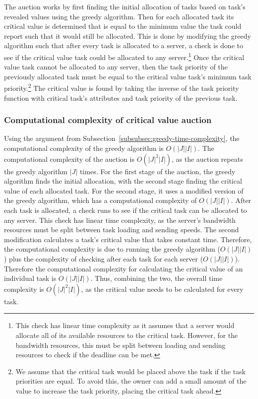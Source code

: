The auction works by first finding the initial allocation of tasks based on task's revealed values using the greedy algorithm. Then for each allocated task its critical value is determined that is equal to the minimum value the task could report such that it would still be allocated. This is done by modifying the greedy algorithm such that after every task is allocated to a server, a check is done to see if the critical value task could be allocated to any server.\footnote{This check has linear time complexity as it assumes that a server would allocate all of its available resources to the critical task. However, for the bandwidth resources, this must be split between loading and sending resources to check if the deadline can be met.} Once the critical value task cannot be allocated to any server, then the task priority of the previously allocated task must be equal to the critical value task's minimum task priority.\footnote{We assume that the critical task would be placed above the task if the task priorities are equal. To avoid this, the owner can add a small amount of the value to increase the task priority, placing the critical task ahead.} The critical value is found by taking the inverse of the task priority function with critical task's attributes and task priority of the previous task.

\subsubsection{Computational complexity of critical value auction}
\label{subsubsec:critical-value-auction-time-complexity}
Using the argument from Subsection~\ref{subsubsec:greedy-time-complexity}, the computational complexity of the greedy algorithm is $O(\left|J\right| \left|I\right|)$. The computational complexity of the auction is $O(\left|J\right|^2 \left|I\right|)$, as the auction repeats the greedy algorithm  $\left|J\right|$ times. For the first stage of the auction, the greedy algorithm finds the initial allocation, with the second stage finding the critical value of each allocated task. For the second stage, it uses a modified version of the greedy algorithm, which has a computational complexity of  $O(\left|J\right| \left|I\right|)$. After each task is allocated, a check runs to see if the critical task can be allocated to any server. This check has linear time complexity, as the server's bandwidth resources must be split between task loading and sending speeds. The second modification calculates a task's critical value that takes constant time. Therefore, the computational complexity is due to running  the greedy algorithm ($O(\left|J\right| \left|I\right|)$) plus the complexity of checking after each task for each server ($O(\left|J\right| \left|I\right|)$). Therefore the computational complexity for calculating the critical value of an individual task is $O(\left|J\right| \left|I\right|)$. Thus, combining the two, the overall time complexity is $O(\left|J\right|^2 \left|I\right|)$, as the critical value needs to be calculated for every task.

